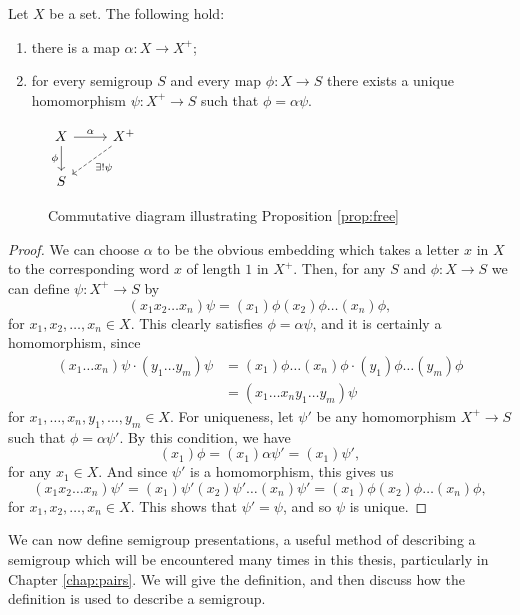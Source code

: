 \begin{proposition}
  \label{prop:free}
  Let $X$ be a set.  The following hold:
  \begin{enumerate}[\rm(i)]
  \item there is a map $\alpha: X \to X^+$;
  \item for every semigroup $S$ and every map $\phi: X \to S$ there exists a
    unique homomorphism $\psi: X^+ \to S$ such that $\phi = \alpha\psi$.
  \end{enumerate}
  \begin{figure}[ht]
    \centering
    $
    \begin{tikzcd}
      X \ar[d, "\phi"'] \ar[r, "\alpha"]
      & X^+ \ar[ld, dashed, "\exists ! \psi"] \\ S
    \end{tikzcd}
    $
    \caption{Commutative diagram illustrating Proposition \ref{prop:free}}
    \label{fig:free}
  \end{figure}
  \begin{proof}
    We can choose $\alpha$ to be the obvious embedding which takes a letter $x$
    in $X$ to the corresponding word $x$ of length $1$ in $X^+$.  Then, for any
    $S$ and $\phi: X \to S$ we can define $\psi: X^+ \to S$ by
    $$(x_1 x_2 \ldots x_n)\psi = (x_1)\phi (x_2)\phi \ldots (x_n)\phi,$$
    for $x_1, x_2, \ldots, x_n \in X$.  This clearly satisfies
    $\phi = \alpha\psi$, and it is certainly a homomorphism, since
    \begin{align*}
      (x_1 \ldots x_n)\psi \cdot (y_1 \ldots y_m)\psi
      & = (x_1)\phi\ldots(x_n)\phi \cdot (y_1)\phi\ldots(y_m)\phi \\
      & = (x_1 \ldots x_ny_1 \ldots y_m)\psi
    \end{align*}
    for $x_1, \ldots, x_n, y_1, \ldots, y_m \in X$.  For uniqueness, let $\psi'$
    be any homomorphism $X^+ \to S$ such that $\phi = \alpha\psi'$.  By this
    condition, we have
    $$(x_1)\phi = (x_1)\alpha\psi' = (x_1)\psi',$$
    for any $x_1 \in X$.  And since $\psi'$ is a homomorphism, this gives us
    $$(x_1x_2\ldots x_n)\psi'
    = (x_1)\psi'(x_2)\psi'\ldots(x_n)\psi'
    = (x_1)\phi (x_2)\phi \ldots(x_n)\phi,$$
    for $x_1, x_2, \ldots, x_n \in X$.
    This shows that $\psi' = \psi$, and so $\psi$ is unique.
  \end{proof}
\end{proposition}

We can now define semigroup presentations, a useful method of describing a
semigroup which will be encountered many times in this thesis, particularly in
Chapter \ref{chap:pairs}.  We will give the definition, and then discuss how the
definition is used to describe a semigroup.

